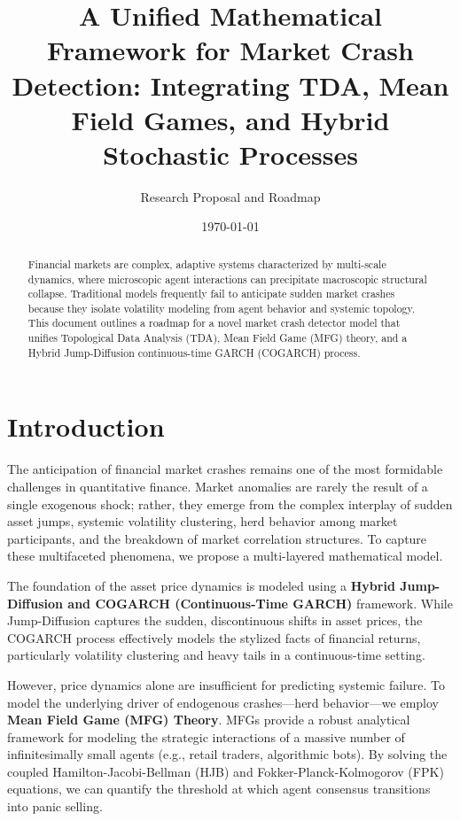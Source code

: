 \documentclass[11pt, a4paper]{article}
\title{\textbf{A Unified Mathematical Framework for Market Crash Detection: Integrating TDA, Mean Field Games, and Hybrid Stochastic Processes}}
\author{Research Proposal and Roadmap}
\date{\today}
\begin{document}
\maketitle

\begin{abstract}
Financial markets are complex, adaptive systems characterized by multi-scale dynamics, where microscopic agent interactions can precipitate macroscopic structural collapse. Traditional models frequently fail to anticipate sudden market crashes because they isolate volatility modeling from agent behavior and systemic topology. This document outlines a roadmap for a novel market crash detector model that unifies Topological Data Analysis (TDA), Mean Field Game (MFG) theory, and a Hybrid Jump-Diffusion continuous-time GARCH (COGARCH) process. 
\end{abstract}

\section{Introduction}

The anticipation of financial market crashes remains one of the most formidable challenges in quantitative finance. Market anomalies are rarely the result of a single exogenous shock; rather, they emerge from the complex interplay of sudden asset jumps, systemic volatility clustering, herd behavior among market participants, and the breakdown of market correlation structures. To capture these multifaceted phenomena, we propose a multi-layered mathematical model.

The foundation of the asset price dynamics is modeled using a \textbf{Hybrid Jump-Diffusion and COGARCH (Continuous-Time GARCH)} framework. While Jump-Diffusion captures the sudden, discontinuous shifts in asset prices, the COGARCH process effectively models the stylized facts of financial returns, particularly volatility clustering and heavy tails in a continuous-time setting. 

However, price dynamics alone are insufficient for predicting systemic failure. To model the underlying driver of endogenous crashes---herd behavior---we employ \textbf{Mean Field Game (MFG) Theory}. MFGs provide a robust analytical framework for modeling the strategic interactions of a massive number of infinitesimally small agents (e.g., retail traders, algorithmic bots). By solving the coupled Hamilton-Jacobi-Bellman (HJB) and Fokker-Planck-Kolmogorov (FPK) equations, we can quantify the threshold at which agent consensus transitions into panic selling.
\end{document}
